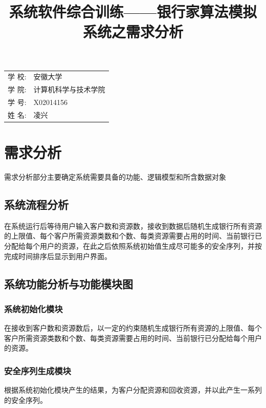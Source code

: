 \documentclass{article}
\title{\heiti 系统软件综合训练——银行家算法模拟系统之需求分析 }
\begin{document}
	
	\maketitle
	
	\vspace{5cm}
	
	\begin{table}[h]
		\centering
		\begin{Large}
			\begin{tabular}{p{3cm} p{7cm}<{\centering}}
				学 \qquad 校: &  安徽大学     \\ \cline{2-2}
				学 \qquad 院: & 计算机科学与技术学院   \\ \cline{2-2}
				学 \qquad 号: & X02014156   \\ \cline{2-2}
				姓 \qquad 名: & 凌兴 \\ \cline{2-2}
			\end{tabular}
		\end{Large}     
	\end{table}
	
	\newpage
	\renewcommand*\contentsname{\centering 目录 }
	\tableofcontents
	
	\newpage
	
	\section{需求分析}
		{\large
			需求分析部分主要确定系统需要具备的功能、逻辑模型和所含数据对象
		}
		\subsection{系统流程分析}
		{\normalsize
			在系统运行后等待用户输入客户数和资源数，接收到数据后随机生成银行所有资源的上限值、每个客户所需资源类数和个数、每类资源需要占用的时间、当前银行已分配给每个用户的资源，在此之后依照系统初始值生成尽可能多的安全序列，并按完成时间排序后显示到用户界面。
		}
		\subsection{系统功能分析与功能模块图}
			\subsubsection{系统初始化模块}
				{\small
					在接收到客户数和资源数后，以一定的约束随机生成银行所有资源的上限值、每个客户所需资源类数和个数、每类资源需要占用的时间、当前银行已分配给每个用户的资源。
				}
			\subsubsection{安全序列生成模块}
				{\small
					根据系统初始化模块产生的结果，为客户分配资源和回收资源，并以此产生一系列的安全序列。
				}
\end{document}

